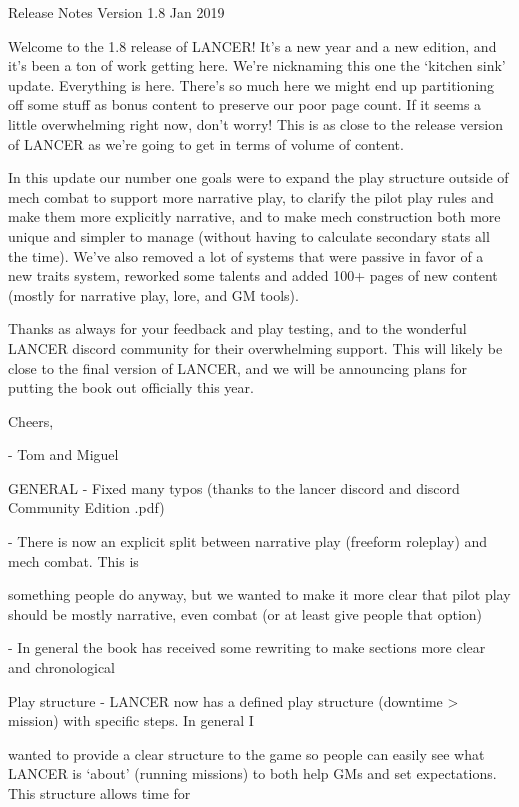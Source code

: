 Release Notes
Version 1.8
Jan 2019

Welcome to the 1.8 release of LANCER! It’s a new year and a new edition, and it’s been a ton of
work getting here. We’re nicknaming this one the ‘kitchen sink’ update. Everything is here. There’s
so much here we might end up partitioning off some stuff as bonus content to preserve our poor
page count. If it seems a little overwhelming right now, don’t worry! This is as close to the release
version of LANCER as we’re going to get in terms of volume of content.

In this update our number one goals were to expand the play structure outside of mech combat to
support more narrative play, to clarify the pilot play rules and make them more explicitly narrative,
and to make mech construction both more unique and simpler to manage (without having to
calculate secondary stats all the time). We’ve also removed a lot of systems that were passive in
favor of a new traits system, reworked some talents and added 100+ pages of new content
(mostly for narrative play, lore, and GM tools).

Thanks as always for your feedback and play testing, and to the wonderful LANCER discord
community for their overwhelming support. This will likely be close to the final version of LANCER,
and we will be announcing plans for putting the book out officially this year.

Cheers,

- Tom and Miguel

GENERAL
     -   Fixed many typos (thanks to the lancer discord and discord Community Edition .pdf)

     -   There is now an explicit split between narrative play (freeform roleplay) and mech combat.  This is

         something people do anyway, but we wanted to make it more clear that pilot play should be
         mostly narrative, even combat (or at least give people that option)

     -   In general the book has received some rewriting to make sections more clear and chronological


Play structure
     -   LANCER now has a defined play structure (downtime > mission) with specific steps. In general I

         wanted to provide a clear structure to the game so people can easily see what LANCER is
         ‘about’ (running missions) to both help GMs and set expectations. This structure allows time for

